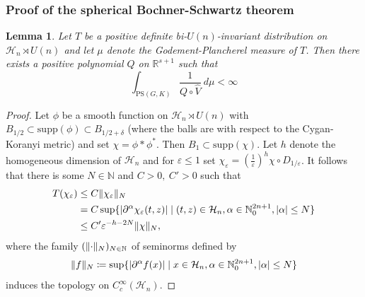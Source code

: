 \documentclass[12pt,reqno,a4paper]{amsart}
\theoremstyle{theorem}
\newtheorem{lemma}[theorem]{Lemma}
\theoremstyle{definition}
\numberwithin{theorem}{section}
\numberwithin{equation}{section}
\newcommand{\R}{\mathbb{R}}
\newcommand{\N}{\mathbb{N}}
\renewcommand{\epsilon}{\varepsilon}
\DeclarePairedDelimiter{\norm}{\lVert}{\rVert}
\DeclarePairedDelimiter{\abs}{\lvert}{\rvert}
\begin{document}
\subsubsection{Proof of the spherical Bochner-Schwartz theorem}
\begin{lemma}\label{l:polynomial_growth_Godement_Plancherel_measure_Heisenberg}
	Let $T$ be a positive definite bi-$U(n)$-invariant distribution on $\mathcal{H}_n\rtimes U(n)$ and let $\mu$ denote the Godement-Plancherel measure of $T$.
	Then there exists a positive polynomial $Q$ on $\R^{s+1}$ such that 
	\[
	\int_{\mathrm{PS}(G, K)} \frac{1}{Q\circ\widehat{V}} \ d\mu<\infty
	\]
\end{lemma}
\begin{proof}
	Let $\phi$ be a smooth function on $\mathcal{H}_n\rtimes U(n)$ with $B_{1/2}\subset \mathrm{supp}(\phi)\subset B_{1/2+\delta}$ (where the balls are with respect to the Cygan-Koranyi metric) and set 
	$\chi = \phi*\phi^*$. Then $B_{1}\subset \mathrm{supp}(\chi)$.
	Let $h$ denote the homogeneous dimension of $\mathcal{H}_n$ and
	for $\epsilon\leq 1$ set $\chi_\epsilon = \left(\frac{1}{\varepsilon}\right)^h\chi\circ D_{1/\varepsilon}$.
	It follows that there is some $N\in \N$ and $C>0,\ C'>0$ such that
	\begin{align*}
		T(\chi_\varepsilon) &\leq C \norm{\chi_\varepsilon}_N\\
		&= C\sup\{\abs{\partial^\alpha\chi_\epsilon(t,z)}\mid (t,z)\in \mathcal{H}_n, \alpha\in \mathbb{N}_0^{2n+1},\abs{\alpha}\leq N\}\\
		&\leq C'\epsilon^{-h-2N}\norm{\chi}_N,
	\end{align*}
	where the family $(\norm{\cdot}_N)_{N\in \N}$ of seminorms defined by
	\[\norm{f}_N\coloneqq\sup\{\abs{\partial^\alpha f(x)}\mid x\in \mathcal{H}_n, \alpha\in \mathbb{N}_0^{2n+1},\abs{\alpha}\leq N\}\]
	induces the topology on $C_c^\infty(\mathcal{H}_n)$.
		

\end{proof}
\end{document}
